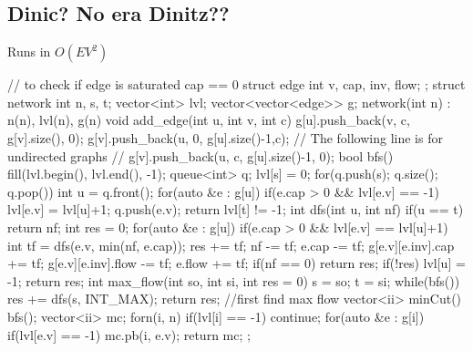 \documentclass[10pt, landscape, twocolumn, a4paper, notitlepage]{article}
\begin{document}
\subsection{Dinic? No era Dinitz??}
Runs in $O(EV^2)$
\begin{code}
// to check if edge is saturated cap == 0
struct edge { int v, cap, inv, flow; };
struct network {
  int n, s, t;
  vector<int> lvl;
  vector<vector<edge>> g;
  network(int n) : n(n), lvl(n), g(n) {}
  void add_edge(int u, int v, int c) {
    g[u].push_back({v, c, g[v].size(), 0});
    g[v].push_back({u, 0, g[u].size()-1,c});
    // The following line is for undirected graphs
    // g[v].push_back({u, c, g[u].size()-1, 0});
  }
  bool bfs() {
    fill(lvl.begin(), lvl.end(), -1);
    queue<int> q;
    lvl[s] = 0;
    for(q.push(s); q.size(); q.pop()) {
      int u = q.front();
      for(auto &e : g[u]) {
        if(e.cap > 0 && lvl[e.v] == -1) {
          lvl[e.v] = lvl[u]+1;
          q.push(e.v);
        }
      }
    }
    return lvl[t] != -1;
  }
  int dfs(int u, int nf) {
    if(u == t) return nf;
    int res = 0;
    for(auto &e : g[u]) {
      if(e.cap > 0 && lvl[e.v] == lvl[u]+1) {
        int tf = dfs(e.v, min(nf, e.cap));
        res += tf; nf -= tf; e.cap -= tf;
        g[e.v][e.inv].cap += tf;
        g[e.v][e.inv].flow -= tf;
        e.flow += tf;
        if(nf == 0) return res;
      }
    }
    if(!res) lvl[u] = -1;
    return res;
  }
  int max_flow(int so, int si, int res = 0) {
    s = so; t = si;
    while(bfs()) res += dfs(s, INT_MAX);
    return res;
  }
  //first find max flow
  vector<ii> minCut() {
    bfs();
    vector<ii> mc;
    forn(i, n) {
        if(lvl[i] == -1) continue;
        for(auto &e : g[i]) {
            if(lvl[e.v] == -1) {
                mc.pb({i, e.v});
            }
        }
    }
    return mc;
  }
};
\end{code}
\end{document}
